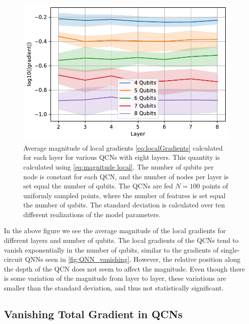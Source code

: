 \begin{figure}[H]
    \centering
    \includegraphics[width=12cm]{latex/figures/vanishing_gradient_partial_input.pdf}
    \caption{Average magnitude of local gradients \cref{eq:localGradients} calculated for each layer for various QCNs with eight layers. This quantity is calculated using \cref{eq:magnitude local}. The number of qubits per node is constant for each QCN, and the number of nodes per layer is set equal the number of qubits. The QCNs are fed $N=100$ points of uniformly sampled points, where the number of features is set equal the number of qubits. The standard deviation is calculated over ten different realizations of the model parameters.}
    \label{fig:QCN_local_vanishing}
\end{figure}

In the above figure we see the average magnitude of the local gradients for different layers and number of qubits. The local gradients of the QCNs tend to vanish exponentially in the number of qubits, similar to the gradients of single-circuit QNNs seen in \cref{fig:QNN_vanishing}. However, the relative position along the depth of the QCN does not seem to affect the magnitude. Even though there is some variation of the magnitude from layer to layer, these variations are smaller than the standard deviation, and thus not statistically significant.

\subsection{Vanishing Total Gradient in QCNs}\label{sec:Vanishing Total Gradients in QCNs}

